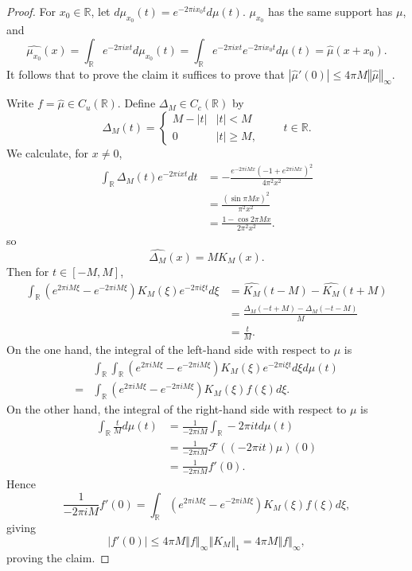 \documentclass{article}
\newcommand{\norm}[1]{\left\Vert #1 \right\Vert}
\theoremstyle{definition}
\begin{document}
\begin{proof}
For $x_0 \in \mathbb{R}$, let $d\mu_{x_0}(t)=e^{-2\pi i x_0 t} d\mu(t)$. $\mu_{x_0}$ has the same support has $\mu$, and
\[
\widehat{\mu_{x_0}}(x) = \int_{\mathbb{R}} e^{-2\pi ix t} d\mu_{x_0}(t)
=\int_{\mathbb{R}} e^{-2\pi ix t} e^{-2\pi ix_0 t} d\mu(t)
=\hat{\mu}(x+x_0).
\]
It follows that to prove the claim it suffices to prove that $|\hat{\mu}'(0)| \leq 4\pi M \norm{\hat{\mu}}_\infty$. 

Write $f=\hat{\mu} \in C_u(\mathbb{R})$. Define $\Delta_M \in C_c(\mathbb{R})$ by
\[
\Delta_M(t)=\begin{cases}
M-|t|&|t|<M\\
0&|t| \geq M,
\end{cases}
\qquad t \in \mathbb{R}.
\]
We calculate, for $x \neq 0$,
\begin{align*}
\int_{\mathbb{R}} \Delta_M(t) e^{-2\pi ix t} dt&=-\frac{e^{-2\pi iMx}(-1+e^{2\pi iMx})^2}{4\pi^2 x^2}\\
&=\frac{(\sin \pi Mx)^2}{\pi^2 x^2}\\
&=\frac{1-\cos 2\pi Mx}{2\pi^2 x^2}.
\end{align*}
so
\[
\widehat{\Delta_M}(x) = MK_M(x).
\]
Then for $t \in [-M,M]$,
\begin{align*}
\int_{\mathbb{R}} (e^{2\pi iM\xi}-e^{-2\pi iM\xi}) K_M(\xi) e^{-2\pi i\xi t} d\xi&=
\widehat{K_M}(t-M)-\widehat{K_M}(t+M)\\
&=\frac{\Delta_M(-t+M)-\Delta_M(-t-M)}{M}\\
&=\frac{t}{M}.
\end{align*}
On the one hand, the integral of the left-hand side with respect to $\mu$ is
\[
\begin{split}
&\int_{\mathbb{R}} \int_{\mathbb{R}} (e^{2\pi iM\xi}-e^{-2\pi iM\xi}) K_M(\xi) e^{-2\pi i\xi t} d\xi d\mu(t)\\
=&\int_{\mathbb{R}}  (e^{2\pi iM\xi}-e^{-2\pi iM\xi}) K_M(\xi) f(\xi) d\xi.
\end{split}
\]
On the other hand, the integral of the right-hand side with respect to $\mu$ is
\begin{align*}
\int_{\mathbb{R}} \frac{t}{M} d\mu(t)&=\frac{1}{-2\pi i M} \int_{\mathbb{R}} -2\pi i t d\mu(t)\\
&=\frac{1}{-2\pi iM} \mathscr{F}((-2\pi it) \mu)(0)\\
&=\frac{1}{-2\pi iM} f'(0).
\end{align*}
Hence
\[
\frac{1}{-2\pi iM} f'(0) = \int_{\mathbb{R}}  (e^{2\pi iM\xi}-e^{-2\pi iM\xi}) K_M(\xi) f(\xi) d\xi,
\]
giving
\[
|f'(0)| \leq 4 \pi M \norm{f}_\infty  \norm{K_M}_1 = 4\pi M \norm{f}_\infty,
\]
proving the claim.
\end{proof}
\end{document}
